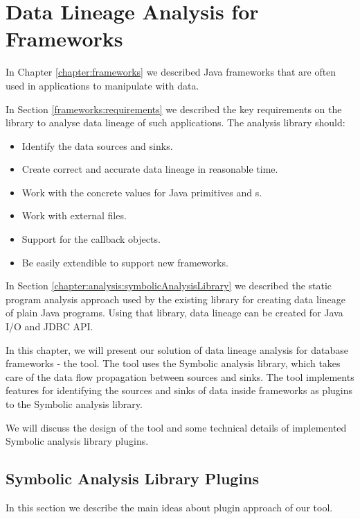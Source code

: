 
\chapter{Data Lineage Analysis for Frameworks \label{chapter:implementation}}

In Chapter \ref{chapter:frameworks} we described Java frameworks
that are often used in applications to manipulate with data.

In Section \ref{frameworks:requirements} we described the key requirements
on the library to analyse data lineage of such applications.
The analysis library should:
\begin{itemize}
  \item Identify the data sources and sinks.
  \item Create correct and accurate data lineage in reasonable time.
  \item Work with the concrete values for Java primitives and s.
  \item Work with external files.
  \item Support for the callback objects.
  \item Be easily extendible to support new frameworks.
\end{itemize}

In Section \ref{chapter:analysis:symbolicAnalysisLibrary} we described the
static program analysis approach used by the existing library
for creating data lineage of plain Java programs.
Using that library, data lineage can be created for Java I/O and JDBC API.

In this chapter, we will present our solution of data lineage analysis
for database frameworks - the \ToolName tool.
The \ToolName tool uses the Symbolic analysis library, which takes
care of the data flow propagation between sources and sinks.
The \ToolName tool implements features for identifying the sources
and sinks of data inside frameworks as plugins to the Symbolic analysis library.

We will discuss the design of the \ToolName tool and some technical details
of implemented Symbolic analysis library plugins.




\section{Symbolic Analysis Library Plugins}

In this section we describe the main ideas about plugin approach of our \ToolName tool.


